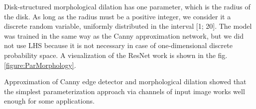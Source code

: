 
Disk-structured morphological dilation has one parameter, which is the radius of the disk. As long as the radius must be a positive integer, we consider it a discrete random variable, uniformly distributed in the interval [1; 20]. The model was trained in the same way as the Canny approximation network, but we did not use LHS because it is not necessary in case of one-dimensional discrete probability space. A visualization of the ResNet work is shown in the fig. \ref{figure:ParMorphology}. 



Approximation of Canny edge detector and morphological dilation showed that the simplest parameterization approach via channels of input image works well enough for some applications.


